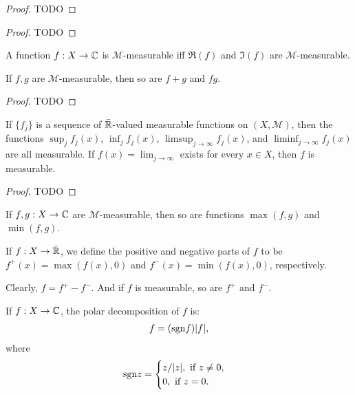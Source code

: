 \begin{proof}
    TODO
\end{proof}

\begin{proof}
    TODO
\end{proof}

\begin{corollary}
    A function $f: X \to \mathbb{C}$ is $\mathcal{M}$-measurable iff $\Re(f)$ and $\Im(f)$ are $\mathcal{M}$-measurable.
\end{corollary}

\begin{proposition}
    If $f,g$ are $\mathcal{M}$-measurable, then so are $f+g$ and $f g$.
\end{proposition}

\begin{proof}
    TODO
\end{proof}

\begin{proposition}
    If $\{f_j\}$ is a sequence of $\bar{\mathbb{R}}$-valued measurable functions on $(X, \mathcal{M})$, then the functions $\sup_j f_j(x)$, $\inf_j f_j(x)$, $\limsup_{j \to \infty} f_j(x)$, and $\liminf_{j \to \infty} f_j(x)$ are all measurable.
    If $f(x) = \lim_{j \to \infty}$ exists for every $x \in X$, then $f$ is measurable.
\end{proposition}

\begin{proof}
    TODO
\end{proof}

\begin{corollary}
    If $f, g: X \to \mathbb{C}$ are $\mathcal{M}$-measurable, then so are functions $\max(f, g)$ and $\min(f, g)$.
\end{corollary}

\begin{definition}
    If $f: X \to \bar{\mathbb{R}}$, we define the positive and negative parts of $f$ to be $f^{+}(x) = \max(f(x), 0)$ and $f^{-}(x) = \min(f(x), 0)$, respectively. 
\end{definition}

Clearly, $f = f^{+} - f^{-}$.
And if $f$ is measurable, so are $f^{+}$ and $f^{-}$.

\begin{definition}
    If $f: X \to \mathbb{C}$, the polar decomposition of $f$ is:
    \begin{align}
        f = (\mathrm{sgn} f) |f|,
    \end{align}
    where 
    \begin{align}
        \mathrm{sgn} z = \begin{cases}
            z / |z|, \text{ if } z \ne 0, \\
            0, \text{ if } z = 0.
        \end{cases}
    \end{align}
\end{definition}

